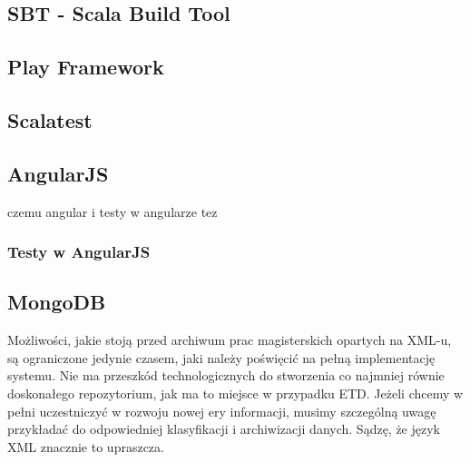 \documentclass[brudnopis]{xmgr}
\begin{document}
\subsection{SBT - Scala Build Tool}

\subsection{Play Framework}

\subsection{Scalatest}

\subsection{AngularJS}

czemu angular i testy w angularze tez

\subsubsection{Testy w AngularJS}

\subsection{MongoDB}

\summary
Możliwości, jakie stoją przed archiwum prac magisterskich opartych na
XML-u, są ograniczone jedynie czasem, jaki należy poświęcić na pełną
implementację systemu. Nie ma przeszkód technologicznych do stworzenia
co najmniej równie doskonałego repozytorium, jak ma to miejsce w
przypadku ETD. Jeżeli chcemy w pełni uczestniczyć w rozwoju nowej ery
informacji, musimy szczególną uwagę przykładać do odpowiedniej
klasyfikacji i archiwizacji danych. Sądzę, że język XML znacznie to
upraszcza.





\nocite{Hinojosa:2013:TIA}
\nocite{Odersky:2014:SBE}





\listoffigures

\oswiadczenie
\end{document}
